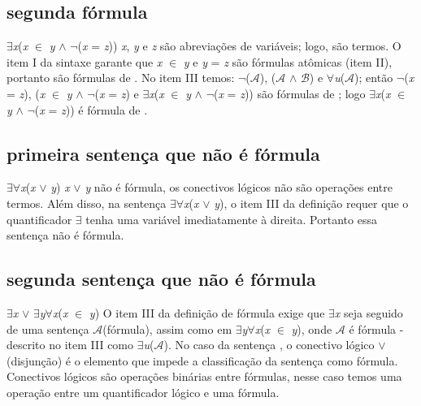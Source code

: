 \subsection{segunda fórmula}
$\exists$\textit{x}(\textit{x} $\in$ \textit{y} $\land$ $\lnot$(\textit{x} = \textit{z}))
\newline
\textit{x}, \textit{y} e \textit{z} são abreviações de variáveis; logo, são termos. O item I da sintaxe  garante que \textit{x} $\in$ \textit{y} e \textit{y} = \textit{z} são fórmulas atômicas (item II), portanto são fórmulas de . No item III temos: $\lnot$($\mathcal{A}$), ($\mathcal{A}$ $\land$ $\mathcal{B}$) e $\forall$\textit{u}($\mathcal{A}$); então $\lnot$(\textit{x} = \textit{z}), (\textit{x} $\in$ \textit{y} $\land$ $\lnot$(\textit{x} = \textit{z}) e $\exists$\textit{x}(\textit{x} $\in$ \textit{y} $\land$ $\lnot$(\textit{x} = \textit{z})) são fórmulas de ; logo \newline$\exists$\textit{x}(\textit{x} $\in$ \textit{y} $\land$ $\lnot$(\textit{x} = \textit{z})) é fórmula de .

\subsection{primeira sentença que não é fórmula}
$\exists$$\forall$\textit{x}(\textit{x} $\lor$ \textit{y})
\newline
\textit{x} $\lor$ \textit{y} não é fórmula, os conectivos lógicos não são operações entre termos. Além disso, na sentença $\exists$$\forall$\textit{x}(\textit{x} $\lor$ \textit{y}), o item III da definição requer que o quantificador $\exists$ tenha uma variável imediatamente à direita. Portanto essa sentença não é fórmula.

\subsection{segunda sentença que não é fórmula}
$\exists$\textit{x} $\lor$ $\exists$\textit{y}$\forall$\textit{x}(\textit{x} $\in$ \textit{y})
\newline
O item III da definição de fórmula exige que $\exists$\textit{x} seja seguido de uma sentença $\mathcal{A}$(fórmula), assim como em $\exists$\textit{y}$\forall$\textit{x}(\textit{x} $\in$ \textit{y}), onde $\mathcal{A}$ é fórmula - descrito no item III como $\exists$\textit{u}($\mathcal{A}$). No caso da sentença , o conectivo lógico $\lor$(disjunção) é o elemento que impede a classificação da sentença como fórmula. Conectivos lógicos são operações binárias entre fórmulas, nesse caso temos uma operação entre um quantificador lógico e uma fórmula.
